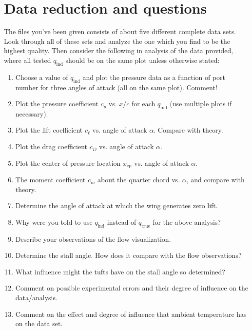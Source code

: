 \documentclass[12pt]{article}
\begin{document}
\newpage
\section{Data reduction and questions}
The files you've been given consists of about five different complete data sets. Look through all of these sets and analyze the one which you find to be the highest quality. Then consider the following in analysis of the data provided, where all tested $q_{\text{ind}}$ should be on the same plot unless otherwise stated:
\begin{enumerate}[noitemsep]
\item Choose a value of $q_{\text{ind}}$ and plot the pressure data as a function of port number for three angles of attack (all on the same plot). Comment!
\item Plot the pressure coefficient $c_p$ vs. $x/c$ for each $q_{\text{ind}}$ (use multiple plots if necessary).
\item Plot the lift coefficient $c_\ell$ vs. angle of attack $\alpha$. Compare with theory.
\item Plot the drag coefficient $c_D$ vs. angle of attack $\alpha$.
\item Plot the center of pressure location $x_{\text{cp}}$ vs. angle of attack $\alpha$.
\item The moment coefficient $c_m$ about the quarter chord vs. $\alpha$, and compare with theory.
\item Determine the angle of attack at which the wing generates zero lift.
\item Why were you told to use $q_{\text{ind}}$ instead of $q_{\text{true}}$ for the above analysis?
\item Describe your observations of the flow visualization.
\item Determine the stall angle. How does it compare with the flow observations?
\item What influence might the tufts have on the stall angle so determined?
\item Comment on possible experimental errors and their degree of influence on the data/analysis.
\item Comment on the effect and degree of influence that ambient temperature has on the data set.
\end{enumerate}
% 
\end{document}
